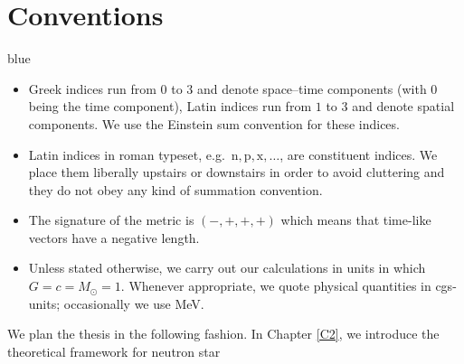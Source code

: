 \section{Conventions}
\begin{color}{blue}
	\begin{itemize}
		\item Greek indices run from $0$ to $3$ and denote space--time components (with
		$0$ being the time component), Latin indices run from $1$ to $3$ and denote
		spatial components. We use the Einstein sum convention for these indices.
		
		\item Latin indices in roman typeset, e.g.\ $\mathrm{n,p,x,\ldots}$, are constituent
		indices. We place them liberally upstairs or downstairs in order to avoid cluttering
		and they do not obey any kind of summation convention.
		
		\item The signature of the metric is $(-,+,+,+)$ which means that time-like vectors
		have a negative length.
		
		\item Unless stated otherwise, we carry out our calculations in units in which
		$G=c=M_\odot=1$. Whenever appropriate, we quote physical quantities in
		cgs-units; occasionally we use MeV.
		

		

		

	\end{itemize}
	
\end{color}

We plan the thesis in the following fashion. In Chapter \ref{C2}, we introduce the theoretical framework for neutron star 






